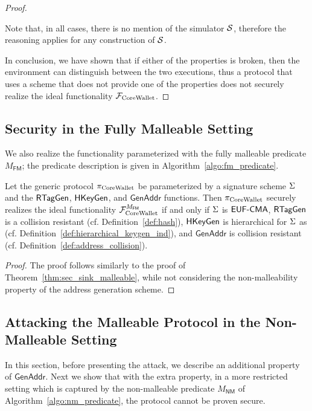 \begin{proof}
\begin{itemize}
    \end{itemize}

    Note that, in all cases, there is no mention of the simulator $\mathcal{S}$,
    therefore the reasoning applies for any construction of $\mathcal{S}$.

    In conclusion, we have shown that if either of the properties is broken,
    then the environment can distinguish between the two executions, thus a
    protocol that uses a scheme that does not provide one of the properties
    does not securely realize the ideal functionality $\mathcal{F}_\mathrm{CoreWallet}$.
\end{proof}

\subsection{Security in the Fully Malleable Setting}

We also realize the functionality parameterized with the fully malleable
predicate $M_{\mathsf{FM}}$; the predicate description is given in
Algorithm~\ref{algo:fm_predicate}.

\begin{theorem}\label{thm:sec_malleable}
    Let the generic protocol $\pi_\mathrm{CoreWallet}$ be parameterized by a signature scheme
    $\Sigma$
    and the $\mathsf{RTagGen}$, $\mathsf{HKeyGen}$, and
    $\mathsf{GenAddr}$ functions. Then $\pi_\mathrm{CoreWallet}$ securely realizes the ideal
    functionality $\mathcal{F}_\mathrm{CoreWallet}^{M_{\mathsf{FM}}}$ if and only if $\Sigma$ is
    $\textsf{EUF-CMA}$, $\mathsf{RTagGen}$ is a collision resistant (cf.
    Definition~\ref{def:hash}), $\mathsf{HKeyGen}$ is
    hierarchical for $\Sigma$ as (cf.
    Definition~\ref{def:hierarchical_keygen_ind}), and $\mathsf{GenAddr}$ is
    collision resistant (cf. Definition~\ref{def:address_collision}).
\end{theorem}
\begin{proof}
    The proof follows similarly to the proof of
    Theorem~\ref{thm:sec_sink_malleable}, while not considering the
    non-malleability property of the address generation scheme.
\end{proof}

\subsection{Attacking the Malleable Protocol in the Non-Malleable Setting}

In this section, before presenting the attack,  we describe an additional
property of $\mathsf{GenAddr}$.  Next we show that with the extra property, in
a more restricted setting which is captured by the non-malleable predicate
$M_{\mathsf{NM}}$ of Algorithm~\ref{algo:nm_predicate}, the protocol cannot be
proven secure.

